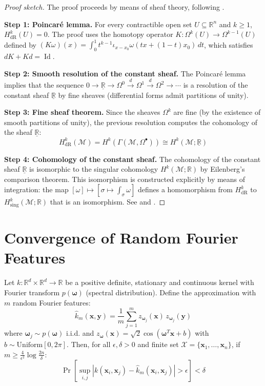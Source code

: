 \begin{proof}[Proof sketch]
The proof proceeds by means of sheaf theory, following \citep{Warner1983}.

\textbf{Step 1: Poincaré lemma.} For every contractible open set $U \subseteq \mathbb{R}^n$ and $k \geq 1$, $H^k_{\text{dR}}(U) = 0$. The proof uses the homotopy operator $K: \Omega^k(U) \to \Omega^{k-1}(U)$ defined by $(K\omega)(x) = \int_0^1 t^{k-1} \iota_{x-x_0} \omega(tx+(1-t)x_0) \, dt$, which satisfies $dK + Kd = \operatorname{Id}$.

\textbf{Step 2: Smooth resolution of the constant sheaf.} The Poincaré lemma implies that the sequence $0 \to \underline{\mathbb{R}} \to \Omega^0 \xrightarrow{d} \Omega^1 \xrightarrow{d} \Omega^2 \to \cdots$ is a resolution of the constant sheaf $\underline{\mathbb{R}}$ by fine sheaves (differential forms admit partitions of unity).

\textbf{Step 3: Fine sheaf theorem.} Since the sheaves $\Omega^k$ are fine (by the existence of smooth partitions of unity), the previous resolution computes the cohomology of the sheaf $\underline{\mathbb{R}}$:
\[
H^k_{\text{dR}}(\mathcal{M}) = H^k(\Gamma(\mathcal{M}, \Omega^\bullet)) \cong H^k(\mathcal{M}; \underline{\mathbb{R}})
\]

\textbf{Step 4: Cohomology of the constant sheaf.} The cohomology of the constant sheaf $\underline{\mathbb{R}}$ is isomorphic to the singular cohomology $H^k(\mathcal{M}; \mathbb{R})$ by Eilenberg's comparison theorem. This isomorphism is constructed explicitly by means of integration: the map $[\omega] \mapsto [\sigma \mapsto \int_\sigma \omega]$ defines a homomorphism from $H^k_{\text{dR}}$ to $H^k_{\text{sing}}(\mathcal{M}; \mathbb{R})$ that is an isomorphism. See \citep[Chapter~5]{Warner1983} and \citep[Chapter~17]{Lee2013}.
\end{proof}

\section{Convergence of Random Fourier Features}\label{sec:convergencia_rff}

\begin{theorem}\label{thm:convergencia_rff_apendice}
Let $k: \mathbb{R}^d \times \mathbb{R}^d \to \mathbb{R}$ be a positive definite, stationary and continuous kernel with Fourier transform $p(\boldsymbol{\omega})$ (spectral distribution). Define the approximation with $m$ random Fourier features:
\[
\hat{k}_m(\mathbf{x}, \mathbf{y}) = \frac{1}{m} \sum_{j=1}^{m} z_{\boldsymbol{\omega}_j}(\mathbf{x}) \, z_{\boldsymbol{\omega}_j}(\mathbf{y})
\]
where $\boldsymbol{\omega}_j \sim p(\boldsymbol{\omega})$ i.i.d. and $z_{\boldsymbol{\omega}}(\mathbf{x}) = \sqrt{2}\cos(\boldsymbol{\omega}^T \mathbf{x} + b)$ with $b \sim \text{Uniform}[0, 2\pi]$. Then, for all $\epsilon, \delta > 0$ and finite set $\mathcal{X} = \{\mathbf{x}_1, \ldots, \mathbf{x}_n\}$, if $m \geq \frac{4}{\epsilon^2}\log\frac{2n}{\delta}$:
\[
\Pr\!\left[\sup_{i,j} |k(\mathbf{x}_i, \mathbf{x}_j) - \hat{k}_m(\mathbf{x}_i, \mathbf{x}_j)| > \epsilon\right] < \delta
\]
\end{theorem}

